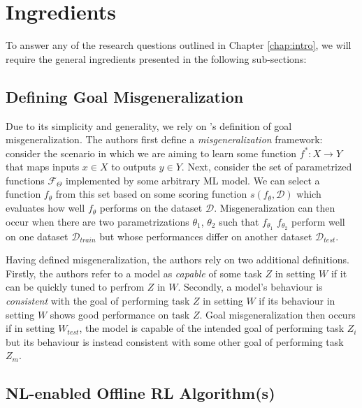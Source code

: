 \documentclass[../main.tex]{subfiles}
\begin{document}
\section{Ingredients}

To answer any of the research questions outlined in Chapter \ref{chap:intro}, we will require the
general ingredients presented in the following sub-sections:

\subsection{Defining Goal Misgeneralization}

Due to its simplicity and generality, we rely on \citet{shah_goal_2022}'s definition of goal
misgeneralization. The authors first define a \textit{misgeneralization} framework: consider the
scenario in which we are aiming to learn some function $f^* : X \rightarrow Y$ that maps inputs $x
	\in X$ to outputs $y \in Y$. Next, consider the set of parametrized functions $\mathcal{F}_\Theta$
implemented by some arbitrary ML model. We can select a function $f_\theta$ from this set based on
some scoring function $s(f_\theta, \mathcal{D})$ which evaluates how well $f_\theta$ performs on the
dataset $\mathcal{D}$. Misgeneralization can then occur when there are two parametrizations
$\theta_1$, $\theta_2$  such that $f_{\theta_1}$ $f_{\theta_2}$ perform well on one dataset
$\mathcal{D}_{train}$ but whose performances differ on another dataset $\mathcal{D}_{test}$.

Having defined misgeneralization, the authors rely on two additional definitions. Firstly, the
authors refer to a model as \textit{capable} of some task $Z$ in setting $W$ if it can be quickly
tuned to perfrom $Z$ in $W$. Secondly, a model's behaviour is \textit{consistent} with the goal of
performing task $Z$ in setting $W$ if its behaviour in setting $W$ shows good performance on task
$Z$. Goal misgeneralization then occurs if in setting $W_{test}$, the model is capable of the
intended goal of performing task $Z_{i}$ but its behaviour is instead consistent with some other
goal of performing task $Z_{m}$.

\subsection{NL-enabled Offline RL Algorithm(s)}
\end{document}

